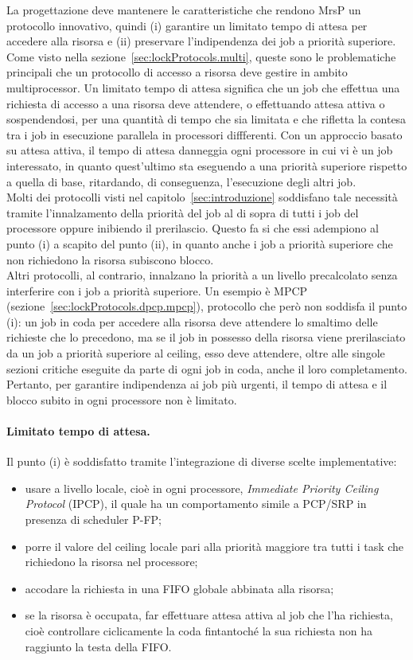 La progettazione deve mantenere le caratteristiche che rendono MrsP un protocollo innovativo, quindi (i) garantire un limitato tempo di attesa per accedere alla risorsa e (ii) preservare l'indipendenza dei job a priorità superiore. Come visto nella sezione~\ref{sec:lockProtocols.multi}, queste sono le problematiche principali che un protocollo di accesso a risorsa deve gestire in ambito multiprocessor. Un limitato tempo di attesa significa che un job che effettua una richiesta di accesso a una risorsa deve attendere, o effettuando attesa attiva o sospendendosi, per una quantità di tempo che sia limitata e che rifletta la contesa tra i job in esecuzione parallela in processori diffferenti. Con un approccio basato su attesa attiva, il tempo di attesa danneggia ogni processore in cui vi è un job interessato, in quanto quest'ultimo sta eseguendo a una priorità superiore rispetto a quella di base, ritardando, di conseguenza, l'esecuzione degli altri job.\\
Molti dei protocolli visti nel capitolo~\ref{sec:introduzione} soddisfano tale necessità tramite l'innalzamento della priorità del job al di sopra di tutti i job del processore oppure inibiendo il prerilascio. Questo fa si che essi adempiono al punto (i) a scapito del punto (ii), in quanto anche i job a priorità superiore che non richiedono la risorsa subiscono blocco.\\
Altri protocolli, al contrario, innalzano la priorità a un livello precalcolato senza interferire con i job a priorità superiore. Un esempio è MPCP (sezione~\ref{sec:lockProtocols.dpcp.mpcp}), protocollo che però non soddisfa il punto (i): un job in coda per accedere alla risorsa deve attendere lo smaltimo delle richieste che lo precedono, ma se il job in possesso della risorsa viene prerilasciato da un job a priorità superiore al ceiling, esso deve attendere, oltre alle singole sezioni critiche eseguite da parte di ogni job in coda, anche il loro completamento. Pertanto, per garantire indipendenza ai job più urgenti, il tempo di attesa e il blocco subito in ogni processore non è limitato.

\paragraph{Limitato tempo di attesa.} Il punto (i) è soddisfatto tramite l'integrazione di diverse scelte implementative:

\begin{itemize}
\item usare a livello locale, cioè in ogni processore, \textit{Immediate Priority Ceiling Protocol} (IPCP), il quale ha un comportamento simile a PCP/SRP in presenza di scheduler P-FP;
\item porre il valore del ceiling locale pari alla priorità maggiore tra tutti i task che richiedono la risorsa nel processore;
\item accodare la richiesta in una FIFO globale abbinata alla risorsa;
\item se la risorsa è occupata, far effettuare attesa attiva al job che l'ha richiesta, cioè controllare ciclicamente la coda fintantoché la sua richiesta non ha raggiunto la testa della FIFO.
\end{itemize}

